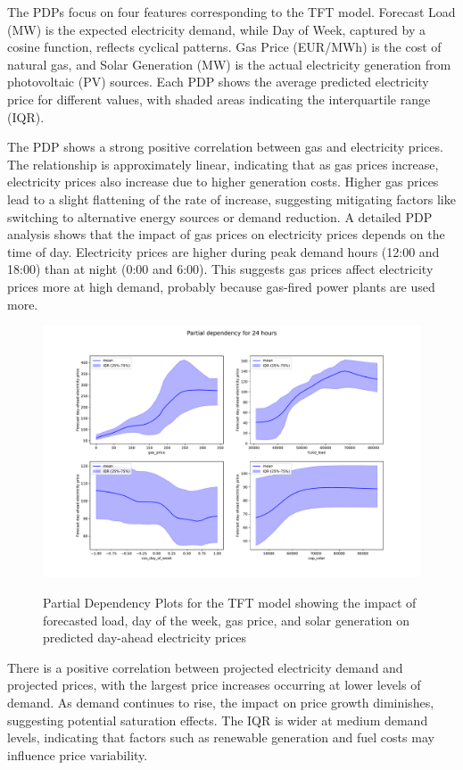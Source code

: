\documentclass[a4paper]{article}
\begin{document}
    The PDPs focus on four features corresponding to the TFT model. Forecast
Load (MW) is the expected electricity demand, while Day of Week,
captured by a cosine function, reflects cyclical patterns. Gas Price
(EUR/MWh) is the cost of natural gas, and Solar Generation (MW) is the
actual electricity generation from photovoltaic (PV) sources. Each PDP
shows the average predicted electricity price for different values, with
shaded areas indicating the interquartile range (IQR).

The PDP shows a strong positive correlation between gas and electricity
prices. The relationship is approximately linear, indicating that as gas
prices increase, electricity prices also increase due to higher
generation costs. Higher gas prices lead to a slight flattening of the
rate of increase, suggesting mitigating factors like switching to
alternative energy sources or demand reduction. A detailed PDP analysis
shows that the impact of gas prices on electricity prices depends on the
time of day. Electricity prices are higher during peak demand hours
(12:00 and 18:00) than at night (0:00 and 6:00). This suggests gas
prices affect electricity prices more at high demand, probably because
gas-fired power plants are used more.

    \begin{figure}
\centering
{\includegraphics[keepaspectratio]{src/tft_pdp_all_hours.pdf}}
\caption{Partial Dependency Plots for the TFT model showing the impact
of forecasted load, day of the week, gas price, and solar generation on
predicted day-ahead electricity prices}
\end{figure}

    There is a positive correlation between projected electricity demand and
projected prices, with the largest price increases occurring at lower
levels of demand. As demand continues to rise, the impact on price
growth diminishes, suggesting potential saturation effects. The IQR is
wider at medium demand levels, indicating that factors such as renewable
generation and fuel costs may influence price variability.
\end{document}
